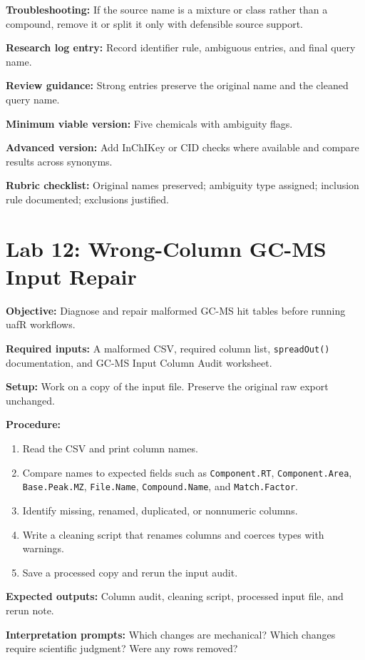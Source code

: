 \textbf{Troubleshooting:} If the source name is a mixture or class rather than a compound, remove it or split it only with defensible source support.

\textbf{Research log entry:} Record identifier rule, ambiguous entries, and final query name.

\textbf{Review guidance:} Strong entries preserve the original name and the cleaned query name.

\textbf{Minimum viable version:} Five chemicals with ambiguity flags.

\textbf{Advanced version:} Add InChIKey or CID checks where available and compare results across synonyms.

\textbf{Rubric checklist:} Original names preserved; ambiguity type assigned; inclusion rule documented; exclusions justified.

\section{Lab 12: Wrong-Column GC-MS Input Repair}
\textbf{Objective:} Diagnose and repair malformed GC-MS hit tables before running uafR workflows.

\textbf{Required inputs:} A malformed CSV, required column list, \texttt{spreadOut()} documentation, and GC-MS Input Column Audit worksheet.

\textbf{Setup:} Work on a copy of the input file. Preserve the original raw export unchanged.

\textbf{Procedure:}
\begin{enumerate}
  \item Read the CSV and print column names.
  \item Compare names to expected fields such as \texttt{Component.RT}, \texttt{Component.Area}, \texttt{Base.Peak.MZ}, \texttt{File.Name}, \texttt{Compound.Name}, and \texttt{Match.Factor}.
  \item Identify missing, renamed, duplicated, or nonnumeric columns.
  \item Write a cleaning script that renames columns and coerces types with warnings.
  \item Save a processed copy and rerun the input audit.
\end{enumerate}

\textbf{Expected outputs:} Column audit, cleaning script, processed input file, and rerun note.

\textbf{Interpretation prompts:} Which changes are mechanical? Which changes require scientific judgment? Were any rows removed?

